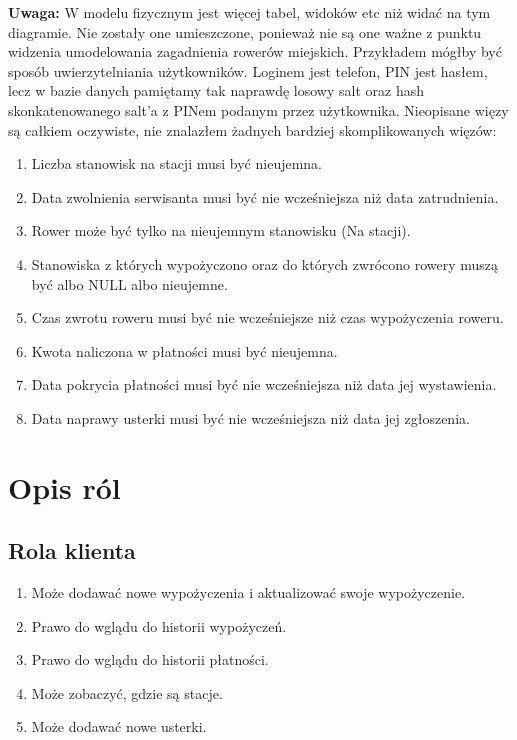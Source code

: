 \documentclass{article}
\begin{document}
\textbf{Uwaga:} W modelu fizycznym jest więcej tabel, widoków etc niż widać na tym diagramie.
Nie zostały one umieszczone, ponieważ nie są one ważne z punktu widzenia umodelowania zagadnienia rowerów miejskich.
Przykładem mógłby być sposób uwierzytelniania użytkowników. Loginem jest telefon, PIN jest hasłem, lecz w bazie danych
pamiętamy tak naprawdę losowy salt oraz hash skonkatenowanego salt'a z PINem podanym przez użytkownika. 
\newline
\newline
Nieopisane więzy są całkiem oczywiste, nie znalazłem żadnych bardziej skomplikowanych więzów:
\begin{enumerate}
	\item Liczba stanowisk na stacji musi być nieujemna.
	\item Data zwolnienia serwisanta musi być nie wcześniejsza niż data zatrudnienia.
	\item Rower może być tylko na nieujemnym stanowisku (Na stacji).
	\item Stanowiska z których wypożyczono oraz do których zwrócono rowery muszą być albo NULL albo nieujemne.
	\item Czas zwrotu roweru musi być nie wcześniejsze niż czas wypożyczenia roweru.
	\item Kwota naliczona w płatności musi być nieujemna.
	\item Data pokrycia płatności musi być nie wcześniejsza niż data jej wystawienia.
	\item Data naprawy usterki musi być nie wcześniejsza niż data jej zgłoszenia.
\end{enumerate}

\section{Opis ról}
\subsection{Rola klienta}
\begin{enumerate}
	\item Może dodawać nowe wypożyczenia i aktualizować swoje wypożyczenie.
	\item Prawo do wglądu do historii wypożyczeń.
	\item Prawo do wglądu do historii płatności.
	\item Może zobaczyć, gdzie są stacje.
	\item Może dodawać nowe usterki.
\end{enumerate}
\end{document}
